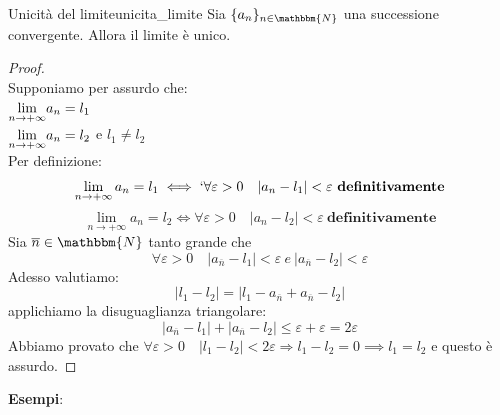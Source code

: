 \documentclass[12pt]{report}
\newcounter{theorem}
\newcommand{\nmu}{}
\begin{document}
	\begin{theorem}{\nmu Unicità del limite}{unicita_limite}
		Sia $\{a_n\}_{n \in \mathbbm{N}}$ una successione convergente. Allora il limite è unico.
		\begin{proof} \quad \\
			Supponiamo per assurdo che: \\
			$\mathlarger{\lim_{n \to +\infty}} a_n = l_1$ \\
			$\mathlarger{\lim_{n \to +\infty}}a_n = l_2$ e $l_1 \neq l_2$ \\
			Per definizione:
			\[
			\lim_{n \to +\infty}a_n = l_1 \iff` \forall \varepsilon > 0 \quad |a_n - l_1| < \varepsilon\ \textbf{definitivamente}
			\]
			\[
			\lim_{n \to +\infty}a_n = l_2 \iff \forall \varepsilon > 0 \quad |a_n - l_2| < \varepsilon\ \textbf{definitivamente}
			\]
			Sia $\overline{n} \in \mathbbm{N}$ tanto grande che \[
			\forall \varepsilon > 0 \quad 	|a_{\overline{n}} - l_1| < \varepsilon\ e\ |a_{\overline{n}} - l_2| < \varepsilon
			\]
			Adesso valutiamo:
			\[
			|l_1 - l_2| = |l_1 - a_{\overline{n}} + a_{\overline{n}} - l_2|
			\]
			applichiamo la disuguaglianza triangolare:
			\[
			|a_{\overline{n}} - l_1 | + |a_{\overline{n}} - l_2| \leq \varepsilon + \varepsilon = 2\varepsilon
			\]
			Abbiamo provato che $\forall \varepsilon > 0 \quad |l_1 - l_2| < 2\varepsilon \Rightarrow l_1 - l_2 = 0 \implies l_1 = l_2$ e questo è assurdo.
		\end{proof}
	\end{theorem}
	\textbf{Esempi}:
\end{document}
